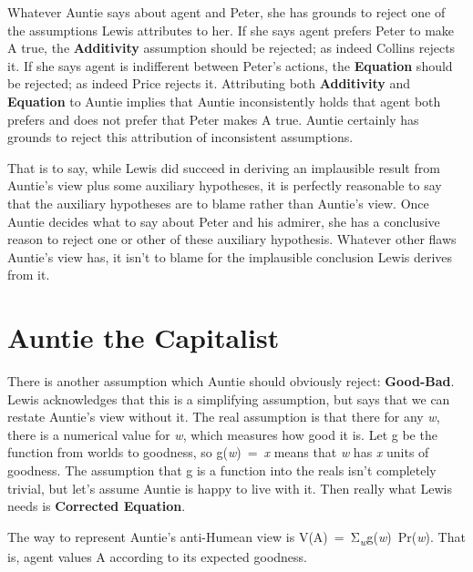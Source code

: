 \documentclass[
  10pt,
  letterpaper,
  DIV=11,
  numbers=noendperiod,
  twoside]{scrartcl}
\providecommand{\tightlist}{%
  \setlength{\itemsep}{0pt}\setlength{\parskip}{0pt}}\usepackage{longtable,booktabs,array}
\begin{document}
Whatever Auntie says about agent and Peter, she has grounds to reject
one of the assumptions Lewis attributes to her. If she says agent
prefers Peter to make A true, the \textbf{Additivity} assumption should
be rejected; as indeed Collins rejects it. If she says agent is
indifferent between Peter's actions, the \textbf{Equation} should be
rejected; as indeed Price rejects it. Attributing both
\textbf{Additivity} and \textbf{Equation} to Auntie implies that Auntie
inconsistently holds that agent both prefers and does not prefer that
Peter makes A true. Auntie certainly has grounds to reject this
attribution of inconsistent assumptions.

That is to say, while Lewis did succeed in deriving an implausible
result from Auntie's view plus some auxiliary hypotheses, it is
perfectly reasonable to say that the auxiliary hypotheses are to blame
rather than Auntie's view. Once Auntie decides what to say about Peter
and his admirer, she has a conclusive reason to reject one or other of
these auxiliary hypothesis. Whatever other flaws Auntie's view has, it
isn't to blame for the implausible conclusion Lewis derives from it.

\section{Auntie the Capitalist}\label{auntie-the-capitalist}

There is another assumption which Auntie should obviously reject:
\textbf{Good-Bad}. Lewis acknowledges that this is a simplifying
assumption, but says that we can restate Auntie's view without it. The
real assumption is that there for any \emph{w}, there is a numerical
value for \emph{w}, which measures how good it is. Let g be the function
from worlds to goodness, so g(\emph{w})~=~\emph{x} means that \emph{w}
has \emph{x} units of goodness. The assumption that g is a function into
the reals isn't completely trivial, but let's assume Auntie is happy to
live with it. Then really what Lewis needs is \textbf{Corrected
Equation}.

\begin{description}
\tightlist
\item[Corrected Equation]
The way to represent Auntie's anti-Humean view is
\newline V(A)~=~Σ\textsubscript{\emph{w}}g(\emph{w})~Pr(\emph{w}). That
is, agent values A according to its expected goodness.
\end{description}
\end{document}
